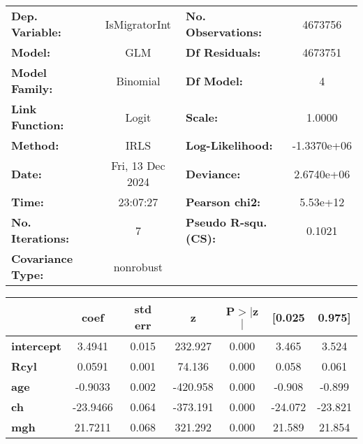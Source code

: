 \begin{center}
\begin{tabular}{lclc}
\toprule
\textbf{Dep. Variable:}   &  IsMigratorInt   & \textbf{  No. Observations:  } &   4673756    \\
\textbf{Model:}           &       GLM        & \textbf{  Df Residuals:      } &   4673751    \\
\textbf{Model Family:}    &     Binomial     & \textbf{  Df Model:          } &         4    \\
\textbf{Link Function:}   &      Logit       & \textbf{  Scale:             } &     1.0000   \\
\textbf{Method:}          &       IRLS       & \textbf{  Log-Likelihood:    } & -1.3370e+06  \\
\textbf{Date:}            & Fri, 13 Dec 2024 & \textbf{  Deviance:          } &  2.6740e+06  \\
\textbf{Time:}            &     23:07:27     & \textbf{  Pearson chi2:      } &   5.53e+12   \\
\textbf{No. Iterations:}  &        7         & \textbf{  Pseudo R-squ. (CS):} &    0.1021    \\
\textbf{Covariance Type:} &    nonrobust     & \textbf{                     } &              \\
\bottomrule
\end{tabular}
\begin{tabular}{lcccccc}
                   & \textbf{coef} & \textbf{std err} & \textbf{z} & \textbf{P$> |$z$|$} & \textbf{[0.025} & \textbf{0.975]}  \\
\midrule
\textbf{intercept} &       3.4941  &        0.015     &   232.927  &         0.000        &        3.465    &        3.524     \\
\textbf{Rcyl}      &       0.0591  &        0.001     &    74.136  &         0.000        &        0.058    &        0.061     \\
\textbf{age}       &      -0.9033  &        0.002     &  -420.958  &         0.000        &       -0.908    &       -0.899     \\
\textbf{ch}        &     -23.9466  &        0.064     &  -373.191  &         0.000        &      -24.072    &      -23.821     \\
\textbf{mgh}       &      21.7211  &        0.068     &   321.292  &         0.000        &       21.589    &       21.854     \\
\bottomrule
\end{tabular}
\end{center}